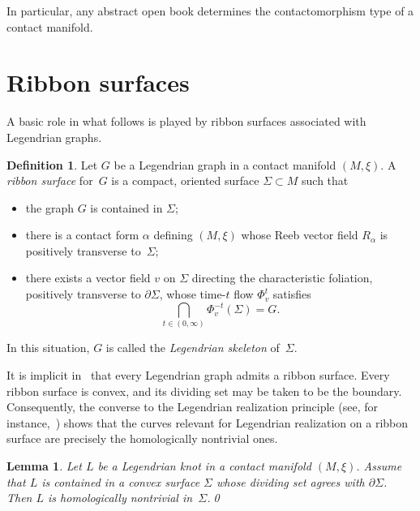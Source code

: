 \documentclass{amsart}
\numberwithin{equation}{section}
\numberwithin{figure}{section}
\newtheorem{lemma}[theorem]{Lemma}
\theoremstyle{definition}
\newtheorem{definition}[theorem]{Definition}
\theoremstyle{remark}
\let\oldSigma\Sigma
\renewcommand{\Sigma}{\oldSigma}
\let\oldalpha\alpha %
\renewcommand{\alpha}{\oldalpha}
\let\olddxi\xi %
\renewcommand{\xi}{\olddxi}
\newcommand{\G}{G}
\begin{document}
In particular, any abstract open book determines the contactomorphism type of a contact manifold.

\section{Ribbon surfaces}\label{sec:ribbon_surfaces}

A basic role in what follows is played by ribbon surfaces associated with Legendrian graphs.

\begin{definition}\label{def:ribbon}
    Let $\G$ be a Legendrian graph in a contact manifold $(M,\xi)$. A \emph{ribbon surface} for~$\G$ is a compact, oriented surface $\Sigma\subset M$ such that
    \begin{itemize}
        \item the graph $\G$ is contained in $\Sigma$;
        \item there is a contact form $\alpha$ defining $(M,\xi)$ whose Reeb vector field $R_\alpha$ is positively transverse to~$\Sigma$; 
        \item there exists a vector field $v$ on $\Sigma$ directing the characteristic foliation, positively transverse to $\partial\Sigma$, whose time-$t$ flow $\Phi^t_v$ satisfies
        \[
        \bigcap_{t\in(0,\infty)} \Phi_v^{-t}(\Sigma) = \G.
        \]
    \end{itemize}
    In this situation, $\G$ is called the \emph{Legendrian skeleton} of~$\Sigma$.
\end{definition}

It is implicit in~\cite{Avdek_surgery} that every Legendrian graph admits a ribbon surface.
Every ribbon surface is convex, and its dividing set may be taken to be the boundary. Consequently, the converse to the Legendrian realization principle (see, for instance,~\cite{Durst_Kegel_OB}) shows that the curves relevant for Legendrian realization on a ribbon surface are precisely the homologically nontrivial ones.

\begin{lemma}\label{lem:inverse_Leg_real}
    Let $L$ be a Legendrian knot in a contact manifold $(M,\xi)$. Assume that $L$ is contained in a convex surface $\Sigma$ whose dividing set agrees with $\partial\Sigma$. Then $L$ is homologically nontrivial in~$\Sigma$.\qed
\end{lemma}
\end{document}
